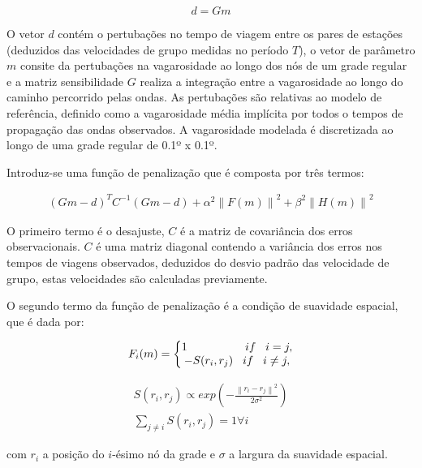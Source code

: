 \begin{equation}
d=Gm
\end{equation} 

O vetor $d$ contém o pertubações no tempo de viagem entre os pares de estações (deduzidos das velocidades de grupo medidas no período $T$), o vetor de parâmetro $m$ consite da pertubações na vagarosidade ao longo dos nós de um grade regular e a matriz sensibilidade $G$ realiza a integração entre a vagarosidade ao longo do caminho percorrido pelas ondas. As pertubações são relativas ao modelo de referência, definido como a vagarosidade média implícita por todos o tempos de propagação das ondas observados. A vagarosidade modelada é discretizada ao longo de uma grade regular de 0.1º x 0.1º. 

Introduz-se uma função de penalização que é composta por três termos:

\begin{eqnarray}
(Gm-d)^{T}C^{-1}(Gm-d) + \alpha ^{2} \left \| F(m)  \right \| ^{2} + \beta ^{2 } \left \| H(m)  \right \| ^{2}
\end{eqnarray}

O primeiro termo é o desajuste, $C$ é a matriz de covariância dos erros observacionais. $C$ é uma matriz diagonal contendo a variância dos erros nos tempos de viagens observados, deduzidos do desvio padrão das velocidade de grupo, estas velocidades são calculadas previamente. 

O segundo termo da função de penalização é a condição de suavidade espacial, que é dada por:

\begin{eqnarray}
F_{i}(m)=
 \left\{\begin{matrix}
1 \hspace{18mm} if \hspace{3mm} i = j,
\\ 
-S(r_{i},r_{j}) \hspace{3mm} if \hspace{3mm} i \neq j,
\end{matrix}\right.
\end{eqnarray}

\begin{eqnarray}
S(r_{i},r_{j}) \propto exp(- \frac{\left \| r_{i}-r_{j}  \right \|^{2}}{2\sigma ^{2}}) \\
\sum_{j\neq i} S(r_{i},r_{j}) = 1         \forall i 
\end{eqnarray}

com $r_{i}$ a posição do $i$-ésimo nó da grade e $\sigma$ a largura da suavidade espacial.

